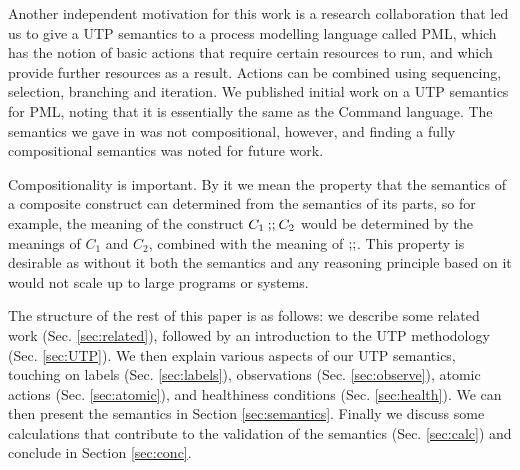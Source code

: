 Another independent motivation for this work
is a research collaboration that led us to give a UTP semantics to a process modelling
language called PML\cite{DBLP:journals/infsof/AtkinsonWN07},
which has the notion of basic actions that require certain resources to run,
and which provide further resources as a result.
Actions can be combined
using sequencing, selection, branching and iteration.
We published initial work on a UTP semantics for PML\cite{conf/tase/BMN16},
noting that it is essentially the same as the Command language.
The semantics we gave in \cite{conf/tase/BMN16} was not compositional, however, and finding a fully compositional semantics was noted
for future work.

Compositionality is important.
By it we mean the property that the semantics of a composite
construct can determined from the semantics of its parts,
so for example, the meaning of the construct $C_1\mathbin{;\!;} C_2$
would be determined by the meanings of $C_1$ and $C_2$,
combined with the meaning of $\mathbin{;\!;}$.
This property is desirable as without it both the semantics
and any reasoning principle based on it would not scale up
to large programs or systems.

The structure of the rest of this paper is as follows:
we describe some related work (Sec. \ref{sec:related}),
followed by an introduction to the UTP methodology (Sec. \ref{sec:UTP}).
We then explain various aspects of our UTP semantics,
touching on labels (Sec. \ref{sec:labels}),
observations (Sec. \ref{sec:observe}),
atomic actions (Sec. \ref{sec:atomic}),
and healthiness conditions (Sec. \ref{sec:health}).
We can then present the semantics in Section \ref{sec:semantics}.
Finally we discuss some calculations
that contribute to the validation of the semantics (Sec. \ref{sec:calc})
and conclude in Section \ref{sec:conc}.
